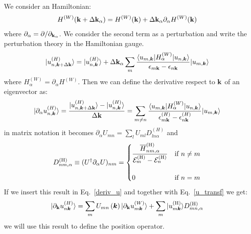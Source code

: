 \documentclass[preprint,showpacs,prb,superscriptaddress,aps,floatfix]{revtex4-1}
\newcommand{\kk}{{\bf k}}
\newcommand{\be}{\begin{equation}}
\newcommand{\ee}{\end{equation}}
\renewcommand{\[}{\left[}
\renewcommand{\]}{\right]}
\renewcommand{\(}{\left(}
\renewcommand{\)}{\right)}
\def\ket#1{\vert#1\rangle}
\def\bra#1{\langle#1\vert}
\def\ph{^{({\rm H})}}
\def\D{{D}\ph}
\begin{document}
We consider an Hamiltonian:
\be
H^{(W)} (\kk + \Delta \kk_\alpha) = H^{(W)} (\kk)  + \Delta \kk_\alpha \partial_\alpha  H^{(W)} (\kk)
\ee
where $\partial_\alpha = \partial/\partial_{\kk_\alpha}$. We consider the second term as a perturbation and write the perturbation theory in the Hamiltonian gauge.
\be
	\ket{ u_{n,\boldsymbol{k}+\Delta \kk}^{\left(H\right)}}=\ket{ u_{n,\boldsymbol{k}}^{\left(H\right)}}+\Delta \kk_\alpha \sum_{m} \frac{\bra{u_{m,\boldsymbol{k} }} H^{(W)}_\alpha   \ket{u_{n,\boldsymbol{k} }}}{\epsilon_{m\kk}-\epsilon_{n\kk}} \ket{u_{m,\boldsymbol{k} }}
\ee
where $ H^{(W)}_\alpha =\partial_\alpha  H^{(W)}$. Then we can define the derivative respect to $\kk$ of an eigenvector as:
\be
\ket{ \partial_\alpha u_{n,\boldsymbol{k}}^{\left(H\right)}}=	\frac{\ket{ u_{n,\boldsymbol{k}+\Delta \kk}^{\left(H\right)}}-\ket{ u_{n,\boldsymbol{k}}^{\left(H\right)}}}{\Delta \kk}= \sum_{m \neq n} \frac{\bra{u_{m,\boldsymbol{k} }} H^{(W)}_\alpha   \ket{u_{n,\boldsymbol{k} }}}{\epsilon^{(H)}_{m\kk}-\epsilon^{(H)}_{n\kk}} \ket{u_{m,\boldsymbol{k} }}
\ee
in matrix notation it becomes $ \partial_\alpha U_{mn} = \sum_l U_{ml} D^{(H)}_{ln\alpha}$ and
\begin{equation}
\D_{nm,\alpha}\equiv (U^{\dagger}
\partial_{\alpha}U)_{nm}=
\begin{cases}
  \displaystyle
  \frac{\overline H_{nm,\alpha}^{(\rm H)}}{{\cal E}^{(\rm H)}_{m}
  -{\cal E}_{n}^{(\rm H)}}& \text{if $n\not= m$}\\ \\
  0& \text{if $n=m$}
\end{cases}
\label{eq:ddef}
\end{equation}
If we insert this result in Eq.~\ref{deriv_u} and together with Eq.~\ref{u_transf} we get:
\begin{equation}
	\ket{ \partial_{\kk} u_{n\boldsymbol{k}}^{\left(H\right)}}=\sum_{m}U_{mn}\left(\boldsymbol{k}\right)\ket{\partial_{\kk} u_{m\boldsymbol{k}}^{\left(W\right)}} + \sum_{m}\ket{u_{m\boldsymbol{k}}\ph} \D_{mn,\alpha}
	\label{deriv_uh}
\end{equation}
we will use this result to define the position operator.
\end{document}
